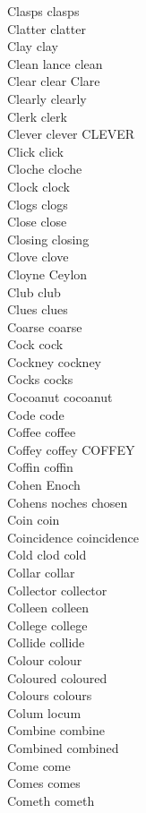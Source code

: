 Clasps clasps\\
Clatter clatter\\
Clay clay\\
Clean lance clean\\
Clear clear Clare\\
Clearly clearly\\
Clerk clerk\\
Clever clever CLEVER\\
Click click\\
Cloche cloche\\
Clock clock\\
Clogs clogs\\
Close close\\
Closing closing\\
Clove clove\\
Cloyne Ceylon\\
Club club\\
Clues clues\\
Coarse coarse\\
Cock cock\\
Cockney cockney\\
Cocks cocks\\
Cocoanut cocoanut\\
Code code\\
Coffee coffee\\
Coffey coffey COFFEY\\
Coffin coffin\\
Cohen Enoch\\
Cohens noches chosen\\
Coin coin\\
Coincidence coincidence\\
Cold clod cold\\
Collar collar\\
Collector collector\\
Colleen colleen\\
College college\\
Collide collide\\
Colour colour\\
Coloured coloured\\
Colours colours\\
Colum locum\\
Combine combine\\
Combined combined\\
Come come\\
Comes comes\\
Cometh cometh\\
